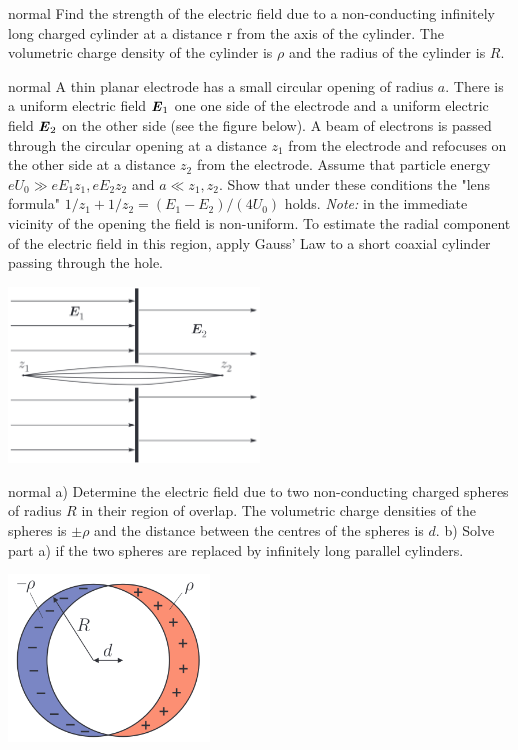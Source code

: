 \hypertarget{P73}{}
\begin{solution}{normal} %
Find the strength of the electric field due to a non-conducting infinitely long charged cylinder at a distance r from the axis of the cylinder. The volumetric charge density of the cylinder is $\rho$ and the radius of the cylinder is $R$.
\end{solution}

\hypertarget{P74}{}
\begin{solution}{normal} %
A thin planar electrode has a small circular opening of radius $a$. There is a uniform electric field $\textbf{\textit{E}}_1$ one one side of the electrode and a uniform electric field $\textbf{\textit{E}}_2$ on the other side (see the figure below). A beam of electrons is passed through the circular opening at a distance $z_1$ from the electrode and refocuses on the other side at a distance $z_2$ from the electrode. Assume that particle energy $eU_0\gg eE_1z_1,eE_2z_2$ and $a\ll z_1,z_2$. Show that under these conditions the "lens formula" $1/z_1+1/z_2=(E_1-E_2)/(4U_0)$ holds. \textit{Note:} in the immediate vicinity of the opening the field is non-uniform. To estimate the radial component of the electric field in this region, apply Gauss' Law to a short coaxial cylinder passing through the hole.
\begin{center}
    \includegraphics[width=0.5\textwidth]{S3 Figures/S3-74.png}
\end{center}
\end{solution}

\hypertarget{P75}{}
\begin{solution}{normal} %
a) Determine the electric field due to two non-conducting charged spheres of radius $R$ in their region of overlap. The volumetric charge densities of the spheres is $\pm \rho$ and the distance between the centres of the spheres is $d$.  b) Solve part a) if the two spheres are replaced by infinitely long parallel cylinders.
\begin{center}
    \includegraphics[width=0.4\textwidth]{S3 Figures/S3-75.png}
\end{center}
\end{solution}

